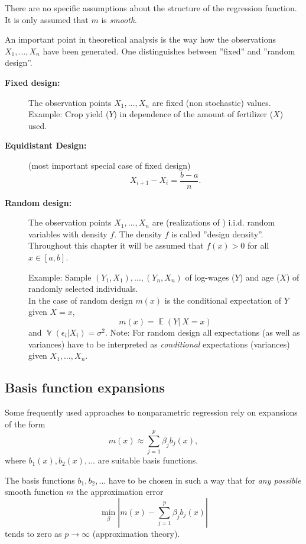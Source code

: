 \documentclass[14pt]{extreport}\usepackage[]{graphicx}\usepackage[]{xcolor}
\DeclareMathOperator{\E}{\mathbb{E}}
\DeclareMathOperator{\V}{\mathbb{V}}
\begin{document}
There are no specific assumptions about the structure
of the regression function. It is only assumed that $m$ is \textit{smooth}.

\bigskip

An important point in theoretical analysis is the way how the observations
 $X_1,\dots,X_n$ have been generated. One distinguishes between ''fixed'' and
''random design''.

\begin{description}
\item[{\bf Fixed design:}]
The observation points $X_1,\dots,X_n$ are fixed  (non stochastic) values.
Example: Crop yield ($Y$) in dependence of the amount of fertilizer ($X$) used.
\item[{\bf Equidistant Design:}]  (most important special case of fixed design)  $$X_{i+1}-X_i=\frac{b-a}{n}.$$
\item[{\bf Random design:}] The observation points $X_1,\dots,X_n$ are (realizations of ) i.i.d. random variables with
density $f$. The density $f$ is called ''design density''. Throughout this chapter it will be assumed that $f(x)>0$ for all
$x\in [a,b]$.

\bigskip
Example: Sample $(Y_1,X_1),\dots,(Y_n,X_n)$ of log-wages ($Y$) and age ($X$) of
randomly selected individuals.\\
In the case of random design $m(x)$ is the conditional expectation of $Y$ given $X=x$,
$$m(x)=\E(Y|\ X=x)$$
and $\V(\epsilon_i|X_i)=\sigma^2$.
Note: For random design all expectations (as well as variances) have to be interpreted as
{\em conditional} expectations (variances) given $X_1,\dots,X_n$.
\end{description}

\subsection{Basis function expansions}

Some frequently used approaches to nonparametric regression rely on expansions of the form
$$
m(x)\approx \sum_{j=1}^p \beta_j b_j(x),
$$
where $b_1(x),b_2(x),\dots$ are suitable basis functions. 

\bigskip

The basis functions $b_1,b_2,\dots$ have to be chosen in such a way that for
{\em any possible} smooth function $m$ the approximation error 
$$
\min_\beta |m(x)-\sum_{j=1}^p \beta_j b_j(x)|$$ 
tends to zero as $p\rightarrow\infty$ (approximation theory).

\bigskip
\end{document}

